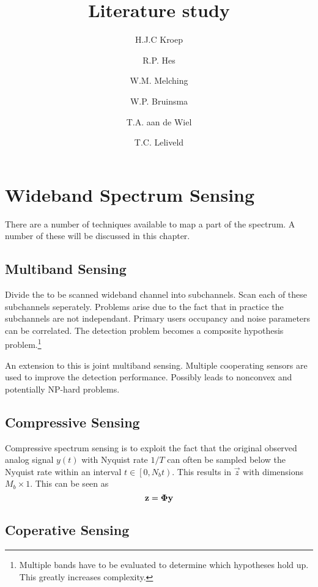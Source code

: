 \documentclass[report]{memoir}
\title{Literature study}
\author{H.J.C Kroep \and R.P. Hes \and W.M. Melching \and W.P. Bruinsma \and T.A. aan de Wiel \and T.C. Leliveld}
\begin{document}
\chapter{Wideband Spectrum Sensing}
There are a number of techniques available to map a part of the spectrum. A number of these will be discussed in this chapter.

\section{Multiband Sensing}
Divide the to be scanned wideband channel into subchannels. Scan each of these subchannels seperately. Problems arise due to the fact that in practice the subchannels are not independant. Primary users occupancy and noise parameters can be correlated. The detection problem becomes a composite hypothesis problem.\footnote{Multiple bands have to be evaluated to determine which hypotheses hold up. This greatly increases complexity.}

An extension to this is joint multiband sensing. Multiple cooperating sensors are used to improve the detection performance. Possibly leads to nonconvex and potentially NP-hard problems.

\section{Compressive Sensing}
Compressive spectrum sensing is to exploit the fact that the original observed analog signal $y(t)$ with Nyquist rate $1/T$ can often be sampled below the Nyquist rate within an interval $t\in \left[0,N_{b}t \right)$. This results in $\vec{z}$ with dimensions $M_b \times 1$. This can be seen as 
\begin{equation}
    \label{nonuniformsampling}
    \boldsymbol{\mathbf{z}} = \boldsymbol{\mathbf{\Phi}}\boldsymbol{\mathbf{y}}
\end{equation}

\section{Coperative Sensing}
\end{document}
